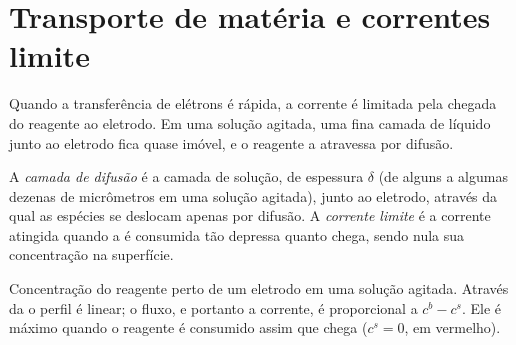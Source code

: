 \section{Transporte de matéria e correntes limite}

Quando a transferência de elétrons é rápida, a corrente é limitada pela
chegada do reagente ao eletrodo. Em uma solução agitada, uma fina camada de
líquido junto ao eletrodo fica quase imóvel, e o reagente a atravessa por
difusão.

\begin{definition}\label{def:b2:current-potential-curves:limiting-current}
A \emph{camada de difusão} é a camada de solução,
de espessura $\delta$ (de alguns a algumas dezenas de micrômetros em uma
solução agitada), junto ao eletrodo, através da qual as espécies se deslocam
apenas por difusão. A \emph{corrente limite} é a corrente
atingida quando a  é consumida tão depressa quanto chega,
sendo nula sua concentração na superfície.
\end{definition}

\begin{omfigure}

{\small Concentração do reagente perto de um eletrodo em uma solução
agitada. Através da  o perfil é linear; o fluxo, e portanto a
corrente, é proporcional a $c^b - c^s$. Ele é máximo quando o reagente é
consumido assim que chega ($c^s = 0$, em vermelho).}
\end{omfigure}


